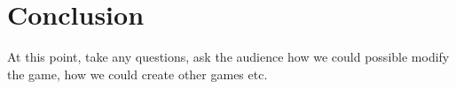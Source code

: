 \documentclass[12pt]{article}
\begin{document}

\section*{Conclusion}
At this point, take any questions, ask the audience how we could possible modify the game, how we could create other games etc.
\end{document}
